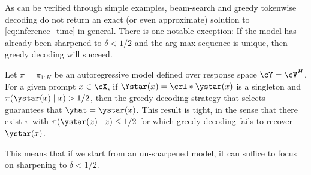  As can be verified through simple examples, beam-search and greedy
  tokenwise decoding do not return an exact (or even approximate)
  solution to \eqref{eq:inference_time} in general. There is one
  notable exception: If the model has already been sharpened to
  $\delta<1/2$ and the arg-max sequence is unique, then greedy
  decoding will succeed.
  \loose
  \begin{proposition}
    \label{prop:greedy}
    Let $\pi=\pi_{1:H}$ be an autoregressive model defined over
    response space $\cY=\cV^{H}$. For a given prompt $x\in\cX$, if
    $\Ystar(x)=\crl*{\ystar(x)}$ is a singleton and
    $\pi(\ystar(x)\mid{}x)>1/2$, then the greedy decoding strategy
    that selects
    guarantees that $\yhat=\ystar(x)$. This result is tight, in the
    sense that there exist $\pi$ with $\pi(\ystar(x)\mid{}x)\leq{}1/2$
    for which greedy decoding fails to recover $\ystar(x)$. \loose
  \end{proposition}
  This means that if we start from an un-sharpened model, it can suffice
  to focus on sharpening to $\delta<1/2$.








  






 

















